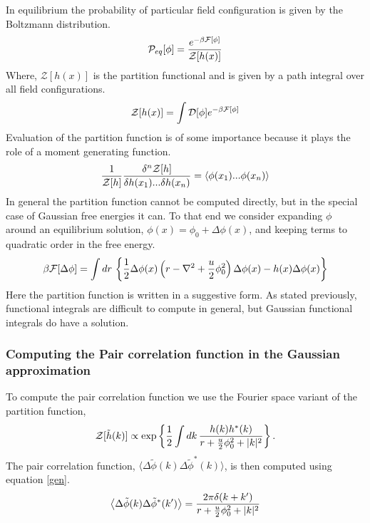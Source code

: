 In equilibrium the probability of particular field configuration is given by
the Boltzmann distribution.
%
\begin{equation} \mathcal{P}_{eq}[\phi] =
\frac{e^{-\beta\mathcal{F}[\phi]}}{\mathcal{Z}[h(x)]} \end{equation}
%
Where, $\mathcal{Z}[h(x)]$ is the partition functional and is given by a path
integral over all field configurations.
%
\begin{equation} \mathcal{Z}[h(x)] = \int \mathcal{D}[\phi] e^{-\beta\mathcal{F}[\phi]}
\end{equation}
%
Evaluation of the partition function is of some importance because it plays the
role of a moment generating function.
%
\begin{equation}\label{gen} \frac{1}{\mathcal{Z}[h]}\frac{\delta^n \mathcal{Z}[h]}{\delta
h(x_1)...\delta h(x_n)} = \langle \phi(x_1)...\phi(x_n)\rangle \end{equation}
%
In general the partition function cannot be computed directly, but in the
special case of Gaussian free energies it can. To that end we consider
expanding $\phi$ around an equilibrium solution, $\phi(x) = \phi_0 +
\Delta\phi(x)$, and keeping terms to quadratic order in the free energy.
%
\begin{equation} \beta\mathcal{F}[\Delta\phi] = \int dr \,\left\lbrace
\frac{1}{2}\Delta\phi(x) \left(r - \nabla^2 + \frac{u}{2}\phi_0^2\right)
\Delta\phi(x) - h(x)\Delta\phi(x) \right\rbrace \end{equation}
%
Here the partition function is written in a suggestive form. As stated
previously, functional integrals are difficult to compute in general, but
Gaussian functional integrals do have a solution.

\subsubsection{Computing the Pair correlation function in the Gaussian
approximation}

To compute the pair correlation function we use the Fourier space variant of
the partition function,
%
\begin{equation} 
    \mathcal{Z}[\tilde{h}(k)] \propto \exp\left\lbrace \frac{1}{2}\int dk\,
        \frac{h(k)h^{*}(k)}{r + \frac{u}{2}\phi_0^2 +  \vert k \vert^2}
        \right\rbrace.
\end{equation} 
%
The pair correlation function, $\langle
\Delta\tilde{\phi}(k)\Delta\tilde{\phi}^{*}(k)\rangle$, is then computed using
equation \ref{gen}.
%
\begin{equation} \left\langle \Delta\tilde{\phi}(k)\Delta\tilde{\phi}^{*}(k^\prime) \right\rangle =
\frac{2\pi \delta(k+k^\prime)}{r + \frac{u}{2}\phi_0^2 + \vert k \vert^2}
\end{equation}
%
